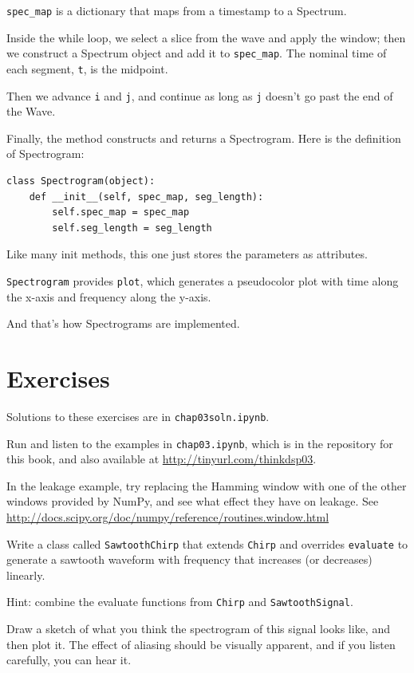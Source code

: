 \documentclass[12pt]{book}
\begin{document}
\verb"spec_map" is a dictionary that maps from a timestamp to
a Spectrum.

Inside the while loop, we select a slice from the wave and apply
the window; then we construct a Spectrum
object and add it to \verb"spec_map".  The nominal time of
each segment, {\tt t}, is the midpoint.

Then we advance {\tt i} and {\tt j}, and continue as long as {\tt j}
doesn't go past the end of the Wave.

Finally, the method constructs and returns a Spectrogram.  Here
is the definition of Spectrogram:

\begin{verbatim}
class Spectrogram(object):
    def __init__(self, spec_map, seg_length):
        self.spec_map = spec_map
        self.seg_length = seg_length
\end{verbatim}

Like many init methods, this one just stores the
parameters as attributes.

{\tt Spectrogram} provides {\tt plot}, which generates a
pseudocolor plot with time along the x-axis and frequency along
the y-axis.

And that's how Spectrograms are implemented.


\section{Exercises}

Solutions to these exercises are in {\tt chap03soln.ipynb}.

\begin{exercise}
Run and listen to the examples in {\tt chap03.ipynb}, which is
in the repository for this book, and also available at
\url{http://tinyurl.com/thinkdsp03}.

In the leakage example, try replacing the Hamming window with one of
the other windows provided by NumPy, and see what effect they have on
leakage.  See
\url{http://docs.scipy.org/doc/numpy/reference/routines.window.html}
\end{exercise}


\begin{exercise}
Write a class called {\tt SawtoothChirp} that extends {\tt Chirp}
and overrides {\tt evaluate} to generate a sawtooth waveform with
frequency that increases (or decreases) linearly.

Hint: combine the evaluate functions from {\tt Chirp} and
{\tt SawtoothSignal}.

Draw a sketch of what you think the spectrogram of this signal
looks like, and then plot it.  The effect of aliasing should be
visually apparent, and if you listen carefully, you can hear it.
\end{exercise}
\end{document}
